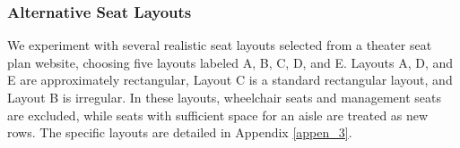




\subsubsection{Alternative Seat Layouts}
We experiment with several realistic seat layouts selected from a theater seat plan website, choosing five layouts labeled A, B, C, D, and E. Layouts A, D, and E are approximately rectangular, Layout C is a standard rectangular layout, and Layout B is irregular. In these layouts, wheelchair seats and management seats are excluded, while seats with sufficient space for an aisle are treated as new rows. The specific layouts are detailed in Appendix \ref{appen_3}.

